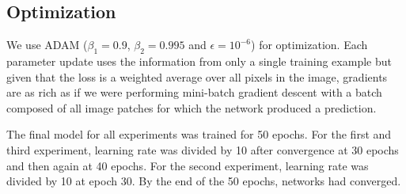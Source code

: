 \subsection{Optimization}
We use ADAM ($\beta_1 = 0.9$, $\beta_2 = 0.995$ and $\epsilon = 10^{-6}$) for optimization.
Each parameter update uses the information from only a single training example but given that the loss is a weighted average over all pixels in the image, gradients are as rich as if we were performing mini-batch gradient descent with a batch composed of all image patches for which the network produced a prediction.

The final model for all experiments was trained for 50 epochs. For the first and third experiment, learning rate was divided by 10 after convergence at 30 epochs and then again at 40 epochs. For the second experiment, learning rate was divided by 10 at epoch 30. By the end of the 50 epochs, networks had converged.
